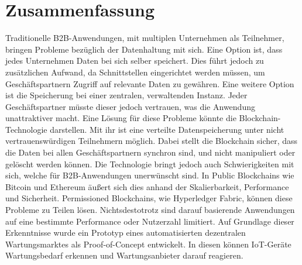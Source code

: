 \pagestyle{empty} %

\chapter*{Zusammenfassung} %
\label{cha:abtract}
Traditionelle B2B-Anwendungen, mit multiplen Unternehmen als Teilnehmer, bringen Probleme bezüglich der Datenhaltung mit sich. Eine Option ist, dass jedes Unternehmen Daten bei sich selber speichert. Dies führt jedoch zu zusätzlichen Aufwand, da Schnittstellen eingerichtet werden müssen, um Geschäftspartnern Zugriff auf relevante Daten zu gewähren. Eine weitere Option ist die Speicherung bei einer zentralen, verwaltenden Instanz. Jeder Geschäftspartner müsste dieser jedoch vertrauen, was die Anwendung unattraktiver macht. Eine Lösung für diese Probleme könnte die Blockchain-Technologie darstellen. Mit ihr ist eine verteilte Datenspeicherung unter nicht vertrauenswürdigen Teilnehmern möglich. Dabei stellt die Blockchain sicher, dass die Daten bei allen Geschäftspartnern synchron sind, und nicht manipuliert oder gelöscht werden können. Die Technologie bringt jedoch auch Schwierigkeiten mit sich, welche für B2B-Anwendungen unerwünscht sind. In Public Blockchains wie Bitcoin und Ethereum äußert sich dies anhand der Skalierbarkeit, Performance und Sicherheit. Permissioned Blockchains, wie Hyperledger Fabric, können diese Probleme zu Teilen lösen. Nichtsdestotrotz sind darauf basierende Anwendungen auf eine bestimmte Performance oder Nutzerzahl limitiert. Auf Grundlage dieser Erkenntnisse wurde ein Prototyp eines automatisierten dezentralen Wartungsmarktes als Proof-of-Concept entwickelt. In diesen können IoT-Geräte Wartungsbedarf erkennen und Wartungsanbieter darauf reagieren.
